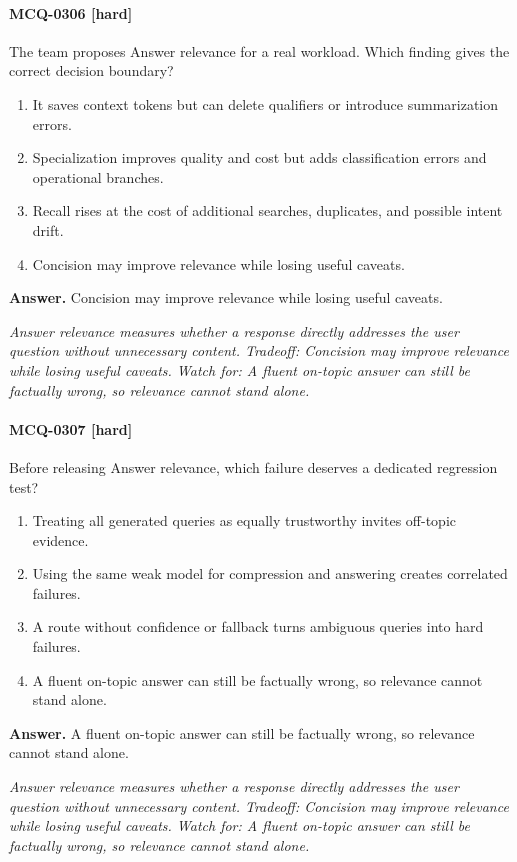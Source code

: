 \paragraph{MCQ-0306 [hard]} The team proposes Answer relevance for a real workload. Which finding gives the correct decision boundary?
\begin{enumerate}[label=\Alph*.]
\item It saves context tokens but can delete qualifiers or introduce summarization errors.
\item Specialization improves quality and cost but adds classification errors and operational branches.
\item Recall rises at the cost of additional searches, duplicates, and possible intent drift.
\item Concision may improve relevance while losing useful caveats.
\end{enumerate}
\noindent\textbf{Answer.} Concision may improve relevance while losing useful caveats.
\par\textit{Answer relevance measures whether a response directly addresses the user question without unnecessary content. Tradeoff: Concision may improve relevance while losing useful caveats. Watch for: A fluent on-topic answer can still be factually wrong, so relevance cannot stand alone.}
\paragraph{MCQ-0307 [hard]} Before releasing Answer relevance, which failure deserves a dedicated regression test?
\begin{enumerate}[label=\Alph*.]
\item Treating all generated queries as equally trustworthy invites off-topic evidence.
\item Using the same weak model for compression and answering creates correlated failures.
\item A route without confidence or fallback turns ambiguous queries into hard failures.
\item A fluent on-topic answer can still be factually wrong, so relevance cannot stand alone.
\end{enumerate}
\noindent\textbf{Answer.} A fluent on-topic answer can still be factually wrong, so relevance cannot stand alone.
\par\textit{Answer relevance measures whether a response directly addresses the user question without unnecessary content. Tradeoff: Concision may improve relevance while losing useful caveats. Watch for: A fluent on-topic answer can still be factually wrong, so relevance cannot stand alone.}
